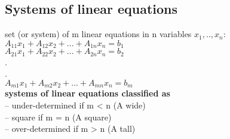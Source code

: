 \subsection{Systems of linear equations}
\textbullet set (or system) of m linear equations in n variables $x_1,.., x_n$: \\
$A_{11}x_1 + A_{12}x_2 + ... + A_{1n}x_n = b_1$\\
$A_{21}x_1 + A_{22}x_2 + ... + A_{2n}x_n = b_2$\\
.\\
.\\
$A_{m1}x_1 + A_{m2}x_2 + ... + A_{mn}x_n = b_m$\\

\textbullet \textbf{systems of linear equations classified as}\\
\thickspace -- under-determined if m < n (A wide)\\
\thickspace -- square if m = n (A square)\\
\thickspace -- over-determined if m > n (A tall)\\